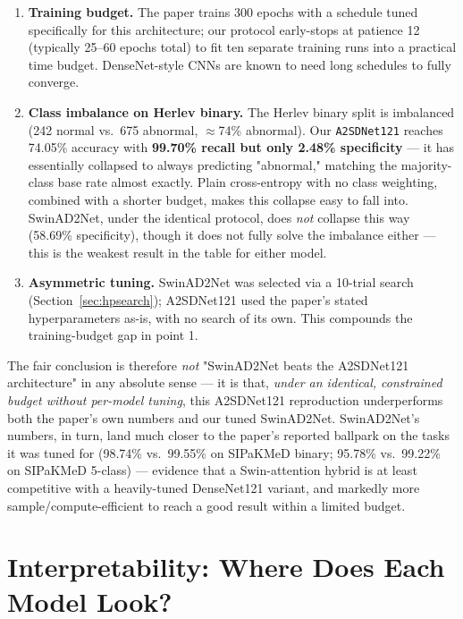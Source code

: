 \documentclass[10pt,twocolumn]{article}
\newcommand{\code}[1]{\texttt{\small #1}}
\begin{document}
\begin{enumerate}[leftmargin=*,itemsep=2pt,topsep=2pt]
    \item \textbf{Training budget.} The paper trains 300 epochs with a schedule tuned specifically for this architecture; our protocol early-stops at patience 12 (typically 25--60 epochs total) to fit ten separate training runs into a practical time budget. DenseNet-style CNNs are known to need long schedules to fully converge.
    \item \textbf{Class imbalance on Herlev binary.} The Herlev binary split is imbalanced (242 normal vs.\ 675 abnormal, $\approx$74\% abnormal). Our \code{A2SDNet121} reaches 74.05\% accuracy with \textbf{99.70\% recall but only 2.48\% specificity} --- it has essentially collapsed to always predicting "abnormal," matching the majority-class base rate almost exactly. Plain cross-entropy with no class weighting, combined with a shorter budget, makes this collapse easy to fall into. SwinAD2Net, under the identical protocol, does \emph{not} collapse this way (58.69\% specificity), though it does not fully solve the imbalance either --- this is the weakest result in the table for either model.
    \item \textbf{Asymmetric tuning.} SwinAD2Net was selected via a 10-trial search (Section~\ref{sec:hpsearch}); A2SDNet121 used the paper's stated hyperparameters as-is, with no search of its own. This compounds the training-budget gap in point 1.
\end{enumerate}

The fair conclusion is therefore \emph{not} "SwinAD2Net beats the A2SDNet121 architecture" in any absolute sense --- it is that, \emph{under an identical, constrained budget without per-model tuning}, this A2SDNet121 reproduction underperforms both the paper's own numbers and our tuned SwinAD2Net. SwinAD2Net's numbers, in turn, land much closer to the paper's reported ballpark on the tasks it was tuned for (98.74\% vs.\ 99.55\% on SIPaKMeD binary; 95.78\% vs.\ 99.22\% on SIPaKMeD 5-class) --- evidence that a Swin-attention hybrid is at least competitive with a heavily-tuned DenseNet121 variant, and markedly more sample/compute-efficient to reach a good result within a limited budget.

\section{Interpretability: Where Does Each Model Look?}
\label{sec:interpretability}
\end{document}
